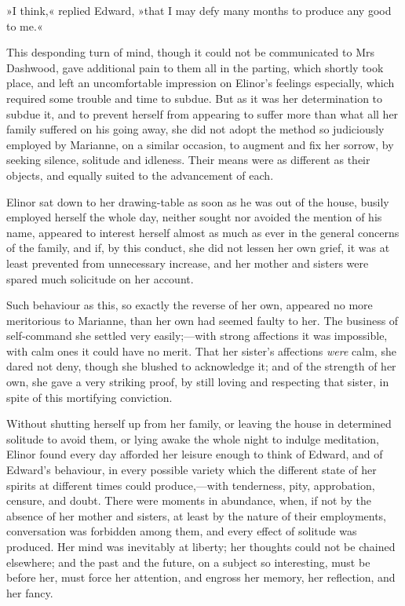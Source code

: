 »I think,« replied Edward, »that I may defy many months to produce any good to me.«

This desponding turn of mind, though it could not be communicated to Mrs Dashwood, gave additional pain to them all in the parting, which shortly took place, and left an uncomfortable impression on Elinor’s feelings especially, which required some trouble and time to subdue. But as it was her determination to subdue it, and to prevent herself from appearing to suffer more than what all her family suffered on his going away, she did not adopt the method so judiciously employed by Marianne, on a similar occasion, to augment and fix her sorrow, by seeking silence, solitude and idleness. Their means were as different as their objects, and equally suited to the advancement of each.

Elinor sat down to her drawing-table as soon as he was out of the house, busily employed herself the whole day, neither sought nor avoided the mention of his name, appeared to interest herself almost as much as ever in the general concerns of the family, and if, by this conduct, she did not lessen her own grief, it was at least prevented from unnecessary increase, and her mother and sisters were spared much solicitude on her account.

Such behaviour as this, so exactly the reverse of her own, appeared no more meritorious to Marianne, than her own had seemed faulty to her. The business of self-command she settled very easily;—with strong affections it was impossible, with calm ones it could have no merit. That her sister’s affections \textit{were} calm, she dared not deny, though she blushed to acknowledge it; and of the strength of her own, she gave a very striking proof, by still loving and respecting that sister, in spite of this mortifying conviction.

Without shutting herself up from her family, or leaving the house in determined solitude to avoid them, or lying awake the whole night to indulge meditation, Elinor found every day afforded her leisure enough to think of Edward, and of Edward’s behaviour, in every possible variety which the different state of her spirits at different times could produce,—with tenderness, pity, approbation, censure, and doubt. There were moments in abundance, when, if not by the absence of her mother and sisters, at least by the nature of their employments, conversation was forbidden among them, and every effect of solitude was produced. Her mind was inevitably at liberty; her thoughts could not be chained elsewhere; and the past and the future, on a subject so interesting, must be before her, must force her attention, and engross her memory, her reflection, and her fancy.

